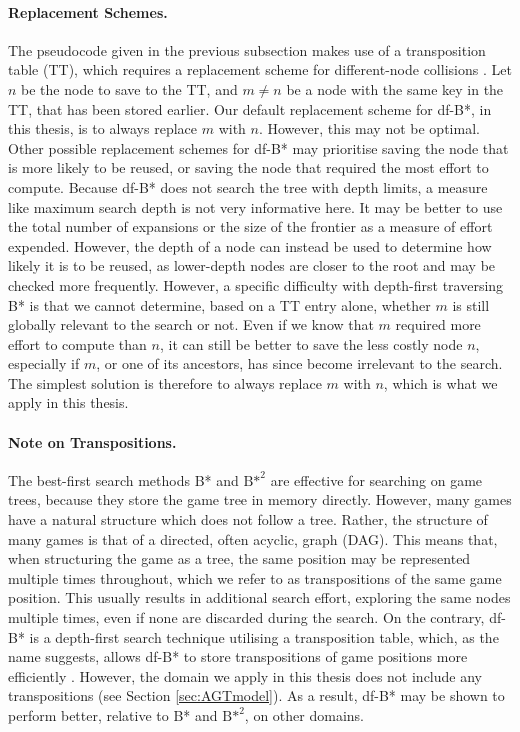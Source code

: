 \paragraph{Replacement Schemes.}
The pseudocode given in the previous subsection makes use of a transposition table (TT), which requires a replacement scheme for different-node collisions \cite{Nagai2002}.
Let $n$ be the node to save to the TT, and $m\neq n$ be a node with the same key in the TT, that has been stored earlier.
Our default replacement scheme for df-B*, in this thesis, is to always replace $m$ with $n$. However, this may not be optimal.
Other possible replacement schemes for df-B* may prioritise saving the node that is more likely to be reused, or saving the node that required the most effort to compute. Because df-B* does not search the tree with depth limits, a measure like maximum search depth is not very informative here. It may be better to use the total number of expansions or the size of the frontier as a measure of effort expended. However, the depth of a node can instead be used to determine how likely it is to be reused, as lower-depth nodes are closer to the root and may be checked more frequently.
However, a specific difficulty with depth-first traversing B* is that we cannot determine, based on a TT entry alone, whether $m$ is still globally relevant to the search or not. Even if we know that $m$ required more effort to compute than $n$, it can still be better to save the less costly node $n$, especially if $m$, or one of its ancestors, has since become irrelevant to the search. The simplest solution is therefore to always replace $m$ with $n$, which is what we apply in this thesis.

\paragraph{Note on Transpositions.}
\label{subsec:dfBstarChallenges:Transpositions}
The best-first search methods B* and ${\text{B*}}^2$ are effective for searching on game trees, because they store the game tree in memory directly. However, many games have a natural structure which does not follow a tree. Rather, the structure of many games is that of a directed, often acyclic, graph (DAG).
This means that, when structuring the game as a tree, the same position may be represented multiple times throughout, which we refer to as transpositions of the same game position. This usually results in additional search effort, exploring the same nodes multiple times, even if none are discarded during the search.
On the contrary, df-B* is a depth-first search technique utilising a transposition table, which, as the name suggests, allows df-B* to store transpositions of game positions more efficiently \cite{Nagai2002}. However, the domain we apply in this thesis does not include any transpositions (see Section \ref{sec:AGTmodel}). As a result, df-B* may be shown to perform better, relative to B* and ${\text{B*}}^2$, on other domains.

